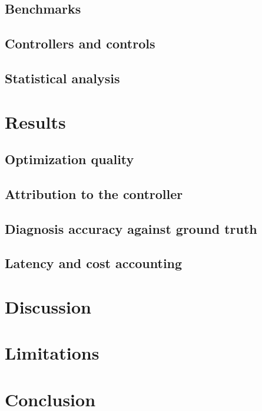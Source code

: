 \documentclass[11pt,a4paper]{article}
\begin{document}
\subsection{Benchmarks}
\subsection{Controllers and controls}
\subsection{Statistical analysis}

\section{Results}
\subsection{Optimization quality}
\subsection{Attribution to the controller}
\subsection{Diagnosis accuracy against ground truth}
\subsection{Latency and cost accounting}

\section{Discussion}

\section{Limitations}

\section{Conclusion}



\end{document}

